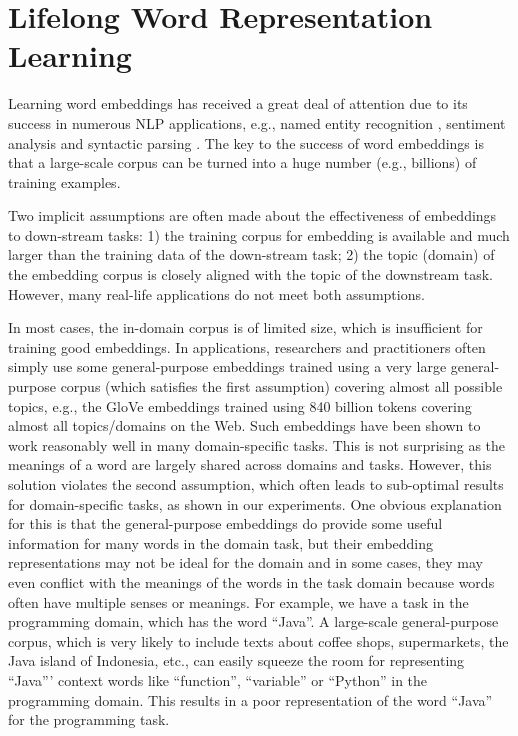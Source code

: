 
\chapter{Lifelong Word Representation Learning}
\label{chap3:word}

Learning word embeddings \cite{mnih2007three,mikolov2013efficient,mikolov2013distributed,pennington2014glove}
has received a great deal of attention due to its success in numerous NLP applications, e.g., named entity recognition \cite{sienvcnik2015adapting}, sentiment analysis \cite{maas2011learning} and syntactic parsing \cite{durrett2015neural}.
The key to the success of word embeddings is that a large-scale corpus can be turned into a huge number (e.g., billions) of training examples.

Two implicit assumptions are often made about the effectiveness of embeddings to down-stream tasks: 
1) the training corpus for embedding is available and much larger than the training data of the down-stream task; 2) the topic (domain) of the embedding corpus is closely aligned with the topic of the downstream task.
However, many real-life applications do not meet both assumptions.

In most cases, the in-domain corpus is of limited size, which is insufficient for training good embeddings. 
In applications, researchers and practitioners often simply use some general-purpose embeddings trained using a very large general-purpose corpus (which satisfies the first assumption) covering almost all possible topics, e.g., the  GloVe embeddings \cite{pennington2014glove} trained using 840 billion tokens covering almost all topics/domains on the Web. Such embeddings have been shown to work reasonably well in many domain-specific tasks. This is not surprising as the meanings of a word are largely shared across domains and tasks. However, this solution violates the second assumption, which often leads to sub-optimal results for domain-specific tasks, as shown in our experiments.
One obvious explanation for this is that the general-purpose embeddings do provide some useful information for many words in the domain task, but their embedding representations may not be ideal for the domain and in some cases, they may even conflict with the meanings of the words in the task domain because words often have multiple senses or meanings.
For example, we have a task in the programming domain, which has the word ``Java''. A large-scale general-purpose corpus, which is very likely to include texts about coffee shops, supermarkets, the Java island of Indonesia, etc., can easily squeeze the room for representing ``Java''' context words like ``function'', ``variable'' or ``Python'' in the programming domain.
This results in a poor representation of the word ``Java'' for the programming task.  

